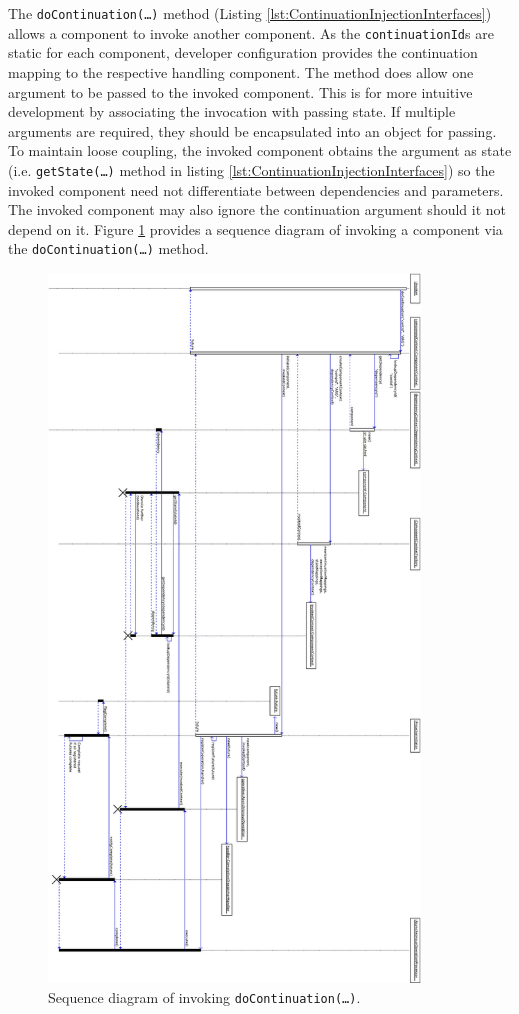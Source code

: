 \documentclass[prodmode]{style/acmlarge}
\begin{document}
The \texttt{doContinuation(\ldots)} method (Listing
\ref{lst:ContinuationInjectionInterfaces}) allows a component to invoke another
component.  As the \texttt{continu\-ationId}s are static for each component,
developer configuration provides the continuation mapping to the respective handling
component.  The method does allow one argument to be passed to the invoked
component.  This is for more intuitive development by associating the invocation
with passing state.  If multiple arguments are required, they should be
encapsulated into an object for passing.  To maintain loose coupling, the
invoked component obtains the argument as state (i.e. \texttt{getState(\ldots)}
method in listing \ref{lst:ContinuationInjectionInterfaces}) so the invoked
component need not differentiate between dependencies and parameters.  The
invoked component may also ignore the continuation argument should it not depend
on it.  Figure \ref{fig:DoContinuationSequenceDiagram} provides a sequence
diagram of invoking a component via the \texttt{doContinuation(\ldots)} method.
  
\begin{figure}[!t]
\centering
\includegraphics[height=7.4in]{DoContinuationSequenceDiagram}
\caption{Sequence diagram of invoking \texttt{doContinuation(\ldots)}.}
\label{fig:DoContinuationSequenceDiagram}
\end{figure}
 
\end{document}
